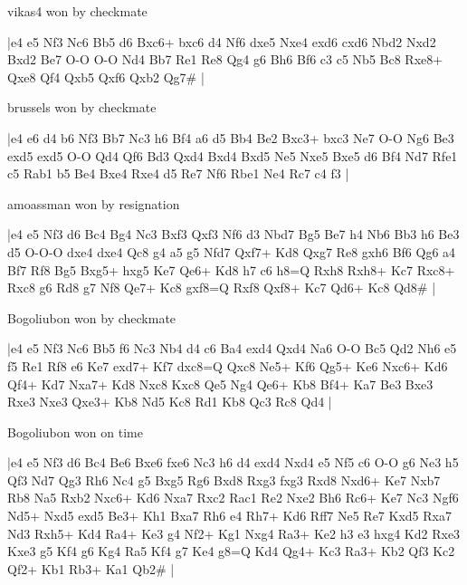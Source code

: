 \showboard

vikas4 won by checkmate

\makegametitle
|e4 e5 Nf3 Nc6 Bb5 d6 Bxc6+ bxc6 d4 Nf6 dxe5 Nxe4 exd6 cxd6 Nbd2 Nxd2 Bxd2 Be7 O-O O-O Nd4 Bb7 Re1 Re8 Qg4 g6 Bh6 Bf6 c3 c5 Nb5 Bc8 Rxe8+ Qxe8 Qf4 Qxb5 Qxf6 Qxb2 Qg7\#  |

\showboard

brussels won by checkmate

\makegametitle
|e4 e6 d4 b6 Nf3 Bb7 Nc3 h6 Bf4 a6 d5 Bb4 Be2 Bxc3+ bxc3 Ne7 O-O Ng6 Be3 exd5 exd5 O-O Qd4 Qf6 Bd3 Qxd4 Bxd4 Bxd5 Ne5 Nxe5 Bxe5 d6 Bf4 Nd7 Rfe1 c5 Rab1 b5 Be4 Bxe4 Rxe4 d5 Re7 Nf6 Rbe1 Ne4 Rc7 c4 f3  |

\showboard

amoassman won by resignation

\makegametitle
|e4 e5 Nf3 d6 Bc4 Bg4 Nc3 Bxf3 Qxf3 Nf6 d3 Nbd7 Bg5 Be7 h4 Nb6 Bb3 h6 Be3 d5 O-O-O dxe4 dxe4 Qc8 g4 a5 g5 Nfd7 Qxf7+ Kd8 Qxg7 Re8 gxh6 Bf6 Qg6 a4 Bf7 Rf8 Bg5 Bxg5+ hxg5 Ke7 Qe6+ Kd8 h7 c6 h8=Q Rxh8 Rxh8+ Kc7 Rxc8+ Rxc8 g6 Rd8 g7 Nf8 Qe7+ Kc8 gxf8=Q Rxf8 Qxf8+ Kc7 Qd6+ Kc8 Qd8\#  |

\showboard

Bogoliubon won by checkmate

\makegametitle
|e4 e5 Nf3 Nc6 Bb5 f6 Nc3 Nb4 d4 c6 Ba4 exd4 Qxd4 Na6 O-O Bc5 Qd2 Nh6 e5 f5 Re1 Rf8 e6 Ke7 exd7+ Kf7 dxc8=Q Qxc8 Ne5+ Kf6 Qg5+ Ke6 Nxc6+ Kd6 Qf4+ Kd7 Nxa7+ Kd8 Nxc8 Kxc8 Qe5 Ng4 Qe6+ Kb8 Bf4+ Ka7 Be3 Bxe3 Rxe3 Nxe3 Qxe3+ Kb8 Nd5 Kc8 Rd1 Kb8 Qc3 Rc8 Qd4  |

\showboard

Bogoliubon won on time

\makegametitle
|e4 e5 Nf3 d6 Bc4 Be6 Bxe6 fxe6 Nc3 h6 d4 exd4 Nxd4 e5 Nf5 c6 O-O g6 Ne3 h5 Qf3 Nd7 Qg3 Rh6 Nc4 g5 Bxg5 Rg6 Bxd8 Rxg3 fxg3 Rxd8 Nxd6+ Ke7 Nxb7 Rb8 Na5 Rxb2 Nxc6+ Kd6 Nxa7 Rxc2 Rac1 Re2 Nxe2 Bh6 Rc6+ Ke7 Nc3 Ngf6 Nd5+ Nxd5 exd5 Be3+ Kh1 Bxa7 Rh6 e4 Rh7+ Kd6 Rff7 Ne5 Re7 Kxd5 Rxa7 Nd3 Rxh5+ Kd4 Ra4+ Ke3 g4 Nf2+ Kg1 Nxg4 Ra3+ Ke2 h3 e3 hxg4 Kd2 Rxe3 Kxe3 g5 Kf4 g6 Kg4 Ra5 Kf4 g7 Ke4 g8=Q Kd4 Qg4+ Kc3 Ra3+ Kb2 Qf3 Kc2 Qf2+ Kb1 Rb3+ Ka1 Qb2\#  |

